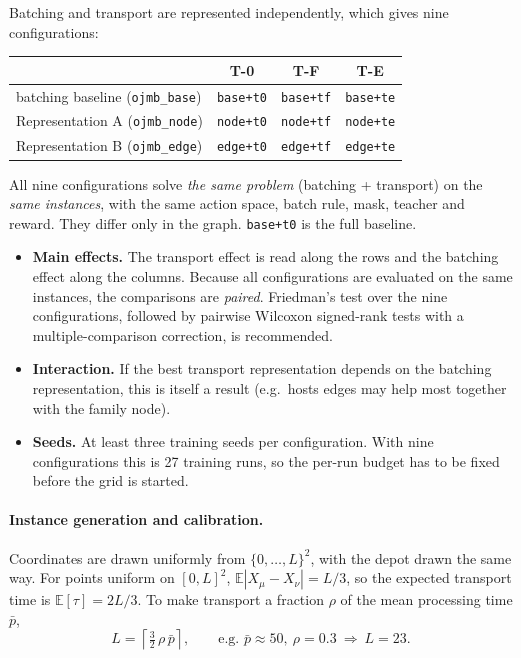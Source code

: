 \documentclass[11pt,a4paper]{article}
\begin{document}
Batching and transport are represented independently, which gives nine
configurations:
\begin{center}
\begin{tabular}{l ccc}
\toprule
 & T-0 & T-F & T-E \\
\midrule
batching baseline (\texttt{ojmb\_base}) & \texttt{base+t0} & \texttt{base+tf} & \texttt{base+te} \\
Representation A (\texttt{ojmb\_node})  & \texttt{node+t0} & \texttt{node+tf} & \texttt{node+te} \\
Representation B (\texttt{ojmb\_edge})  & \texttt{edge+t0} & \texttt{edge+tf} & \texttt{edge+te} \\
\bottomrule
\end{tabular}
\end{center}
All nine configurations solve \emph{the same problem} (batching + transport) on
the \emph{same instances}, with the same action space, batch rule, mask, teacher
and reward. They differ only in the graph. \texttt{base+t0} is the full
baseline.

\begin{itemize}
  \item \textbf{Main effects.} The transport effect is read along the rows and
    the batching effect along the columns. Because all configurations are
    evaluated on the same instances, the comparisons are \emph{paired}.
    Friedman's test over the nine configurations, followed by pairwise Wilcoxon
    signed-rank tests with a multiple-comparison correction, is recommended.
  \item \textbf{Interaction.} If the best transport representation depends on
    the batching representation, this is itself a result (e.g.\ \textsf{hosts}
    edges may help most together with the family node).
  \item \textbf{Seeds.} At least three training seeds per configuration. With
    nine configurations this is 27 training runs, so the per-run budget has to
    be fixed before the grid is started.
\end{itemize}

\paragraph{Instance generation and calibration.}
Coordinates are drawn uniformly from $\{0,\dots,L\}^2$, with the depot drawn the
same way. For points uniform on $[0,L]^2$, $\mathbb{E}|X_\mu-X_\nu|=L/3$, so the
expected transport time is $\mathbb{E}[\tau]=2L/3$. To make transport a fraction
$\rho$ of the mean processing time $\bar p$,
\begin{equation}
  L=\left\lceil \tfrac{3}{2}\,\rho\,\bar p\right\rceil,
  \qquad\text{e.g. } \bar p\approx 50,\ \rho=0.3\ \Rightarrow\ L=23.
\end{equation}
\end{document}
